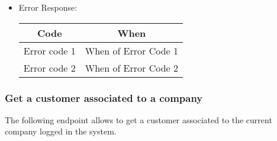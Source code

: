 \begin{itemize}
    \item Error Response:
    \begin{table}[!h]
    \centering 
    \begin{tabular}{|c|c|}
    \hline
    \multicolumn{1}{|c|}{\textbf{Code}} & \multicolumn{1}{c|}{\textbf{When}} \\ \hline
    Error code 1 & When of Error Code 1 \\\hline
    Error code 2 & When of Error Code 2 \\\hline
    \end{tabular} 
    \end{table} 
    
\end{itemize}


\subsubsection*{Get a customer associated to a company}

The following endpoint allows to get a customer associated to the current company logged in the system.

